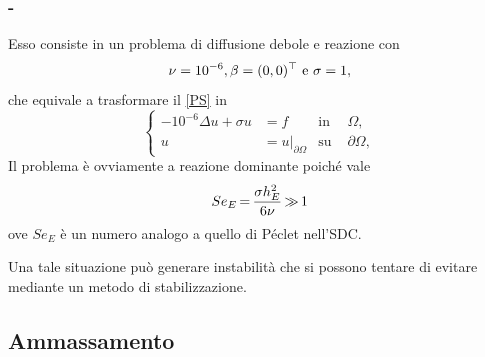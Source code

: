 \documentclass[11pt]{beamer}
\newcommand{\SpaziaturaMate}[3]{
    \setlength{\thinmuskip}{#1mu}
    \setlength{\medmuskip}{#2mu}
    \setlength{\thickmuskip}{#3mu}
}
\newcommand{\teqref}[2]{\hyperref[#1]{#2}}
\begin{document}
                \begin{frame}\frametitle{\titoloSez{} - \insertsubsection{}}

                    Esso consiste in un problema di diffusione debole e reazione con
                    \begin{equation*}
                        \setlength{\abovedisplayskip}{5pt plus 2pt minus 2pt}  %
                        \setlength{\belowdisplayskip}{5pt plus 2pt minus 2pt}  %
                        \nu=10^{-6}, \beta=(0,0)^{\top}\text{ e }\sigma=1,
                    \end{equation*}
                    che equivale a trasformare il \teqref{eqProblemaStazionario}{[PS]} in
                    \begin{equation*}
                        \left\{
                        \begin{aligned}
                            -10^{-6}\Delta u+\sigma u&=f&\text{in }&\Omega, \\
                            u&=u\vert_{\partial\Omega}&\text{su }&\partial\Omega,
                        \end{aligned}
                        \right.
                        \label{eqSDR}
                    \end{equation*}
                    Il problema è ovviamente a reazione dominante poiché vale
                    \begin{equation*}
                        \SpaziaturaMate{1}{2}{3}
                        Se_E=\frac{\sigma h_E^2}{6\nu}\gg1
                    \end{equation*}
                    ove $Se_E$ è un numero analogo a quello di Péclet nell'SDC.
                    
                    Una tale situazione può generare instabilità che si possono tentare di evitare mediante un metodo di stabilizzazione.
                \end{frame}

            \subsection{Ammassamento}
          
\end{document}
